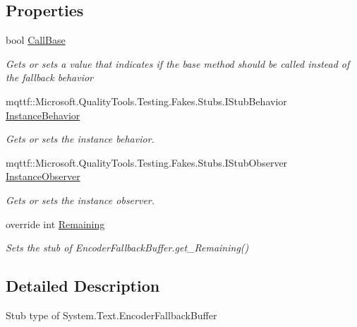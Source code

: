 \subsection*{Properties}
\begin{DoxyCompactItemize}
\item 
bool \hyperlink{class_system_1_1_text_1_1_fakes_1_1_stub_encoder_fallback_buffer_a425db597ba6d77668b8aa155744c2ff2}{Call\-Base}
\begin{DoxyCompactList}\small\item\em Gets or sets a value that indicates if the base method should be called instead of the fallback behavior\end{DoxyCompactList}\item 
mqttf\-::\-Microsoft.\-Quality\-Tools.\-Testing.\-Fakes.\-Stubs.\-I\-Stub\-Behavior \hyperlink{class_system_1_1_text_1_1_fakes_1_1_stub_encoder_fallback_buffer_a381e1be1d8d8416f28964cc2686a6ec3}{Instance\-Behavior}
\begin{DoxyCompactList}\small\item\em Gets or sets the instance behavior.\end{DoxyCompactList}\item 
mqttf\-::\-Microsoft.\-Quality\-Tools.\-Testing.\-Fakes.\-Stubs.\-I\-Stub\-Observer \hyperlink{class_system_1_1_text_1_1_fakes_1_1_stub_encoder_fallback_buffer_abafad81b2ee116868d5699b2a1a67e80}{Instance\-Observer}
\begin{DoxyCompactList}\small\item\em Gets or sets the instance observer.\end{DoxyCompactList}\item 
override int \hyperlink{class_system_1_1_text_1_1_fakes_1_1_stub_encoder_fallback_buffer_aac291638a8fcb3a0d0748f45cd013646}{Remaining}
\begin{DoxyCompactList}\small\item\em Sets the stub of Encoder\-Fallback\-Buffer.\-get\-\_\-\-Remaining()\end{DoxyCompactList}\end{DoxyCompactItemize}


\subsection{Detailed Description}
Stub type of System.\-Text.\-Encoder\-Fallback\-Buffer



